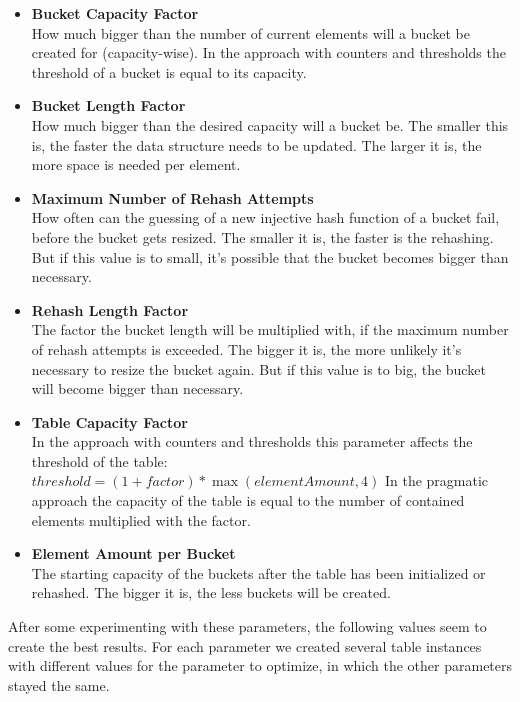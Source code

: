 \documentclass{article}
\begin{document}
\begin{itemize}
  \item \textbf{Bucket Capacity Factor}\\
  	How much bigger than the number of current elements will a bucket be created for (capacity-wise). In the approach with counters and thresholds the threshold of a bucket is equal to its capacity.
  \item \textbf{Bucket Length Factor}\\
    How much bigger than the desired capacity will a bucket be. The smaller this is, the faster the data structure needs to be updated. The larger it is, the more space is needed per element.
  \item \textbf{Maximum Number of Rehash Attempts}\\
  	How often can the guessing of a new injective hash function of a bucket fail, before the bucket gets resized. The smaller it is, the faster is the rehashing. But if this value is to small, it's possible that the bucket becomes bigger than necessary.
  \item \textbf{Rehash Length Factor}\\
    The factor the bucket length will be multiplied with, if the maximum number of rehash attempts is exceeded. The bigger it is, the more unlikely it's necessary to resize the bucket again. But if this value is to big, the bucket will become bigger than necessary.
  \item \textbf{Table Capacity Factor}\\
    In the approach with counters and thresholds this parameter affects the threshold of the table: $ threshold = (1 + factor) * \max(elementAmount, 4) $
    In the pragmatic approach the capacity of the table is equal to the number of contained elements multiplied with the factor.
  \item \textbf{Element Amount per Bucket}\\
    The starting capacity of the buckets after the table has been initialized or rehashed. The bigger it is, the less buckets will be created.
\end{itemize}

After some experimenting with these parameters, the following values seem to create the best results. For each parameter we created several table instances with different values for the parameter to optimize, in which the other parameters stayed the same.
\end{document}
